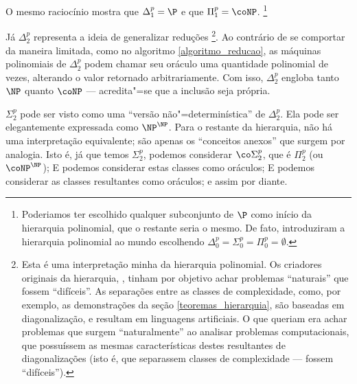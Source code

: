 O mesmo raciocínio mostra que $\Delta_1^p = \P$
e que $\Pi_1^p = \coNP$.
\footnote{
    Poderiamos ter escolhido qualquer subconjunto de $\P$
    como início da hierarquia polinomial,
    que o restante seria o mesmo.
    De fato, 
    introduziram a hierarquia polinomial ao mundo
    escolhendo $\Delta_0^p = \Sigma_0^p = \Pi_0^p = \emptyset$.
}

Já $\Delta_2^p$ representa a ideia de generalizar reduções%
\footnote{
    Esta é uma interpretação minha da hierarquia polinomial.
    Os criadores originais da hierarquia,
    ,
    tinham por objetivo achar problemas ``naturais''
    que fossem ``difíceis''.
    As separações entre as classes de complexidade,
    como, por exemplo, as demonstrações da seção \ref{teoremas_hierarquia},
    são baseadas em diagonalização,
    e resultam em linguagens artificiais.
    O que  queriam
    era achar problemas que surgem ``naturalmente''
    ao analisar problemas computacionais,
    que possuíssem as mesmas características
    destes resultantes de diagonalizações
    (isto é, que separassem classes de complexidade
    --- fossem ``difíceis'').
}.
Ao contrário de se comportar da maneira limitada,
como no algoritmo \ref{algoritmo_reducao},
as máquinas polinomiais de $\Delta_2^p$
podem chamar seu oráculo uma quantidade polinomial de vezes,
alterando o valor retornado arbitrariamente.
Com isso, $\Delta_2^p$ engloba tanto $\NP$ quanto $\coNP$
--- acredita"=se que a inclusão seja própria.

$\Sigma_2^p$ pode ser visto como uma ``versão não"=determinística'' de $\Delta_2^p$.
Ela pode ser elegantemente expressada como $\NP^\NP$.
Para o restante da hierarquia,
não há uma interpretação equivalente;
são apenas os ``conceitos anexos'' que surgem por analogia.
Isto é, já que temos $\Sigma_2^p$,
podemos considerar $\co \Sigma_2^p$, que é $\Pi_2^p$
(ou $\coNP^\NP$);
E podemos considerar estas classes como oráculos;
E podemos considerar as classes resultantes como oráculos;
e assim por diante.
